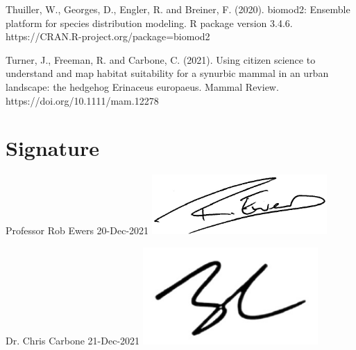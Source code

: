 \documentclass[11pt, a4paper]{article}
\begin{document}
Thuiller, W., Georges, D., Engler, R. and Breiner, F. (2020). biomod2: Ensemble platform for species distribution modeling. R package version 3.4.6. https://CRAN.R-project.org/package=biomod2

Turner, J., Freeman, R. and Carbone, C. (2021). Using citizen science to understand and map habitat suitability for a synurbic mammal in an urban landscape: the hedgehog Erinaceus europaeus. Mammal Review. https://doi.org/10.1111/mam.12278

\section{Signature}
Professor Rob Ewers 20-Dec-2021
  \includegraphics[width=0.5\textwidth]{RE_sign.pdf}
  
Dr. Chris Carbone 21-Dec-2021
  \includegraphics[width=0.5\textwidth]{CC_sign.pdf}
\end{document}
